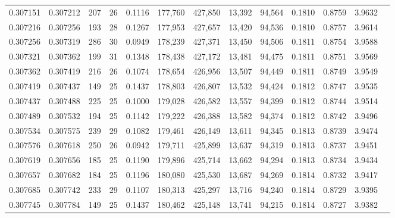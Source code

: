 \begin{tabular}{rrrrrrrrrrrrr}
0.307151 & 0.307212 &   207 &  26 &                                     0.1116 & 177,760 & 427,850 &  13,392 &  94,564 & 0.1810 & 0.8759 & 3.9632 \\
0.307216 & 0.307256 &   193 &  28 &                                     0.1267 & 177,953 & 427,657 &  13,420 &  94,536 & 0.1810 & 0.8757 & 3.9614 \\
0.307256 & 0.307319 &   286 &  30 &                                     0.0949 & 178,239 & 427,371 &  13,450 &  94,506 & 0.1811 & 0.8754 & 3.9588 \\
0.307321 & 0.307362 &   199 &  31 &                                     0.1348 & 178,438 & 427,172 &  13,481 &  94,475 & 0.1811 & 0.8751 & 3.9569 \\
0.307362 & 0.307419 &   216 &  26 &                                     0.1074 & 178,654 & 426,956 &  13,507 &  94,449 & 0.1811 & 0.8749 & 3.9549 \\
0.307419 & 0.307437 &   149 &  25 &                                     0.1437 & 178,803 & 426,807 &  13,532 &  94,424 & 0.1812 & 0.8747 & 3.9535 \\
0.307437 & 0.307488 &   225 &  25 &                                     0.1000 & 179,028 & 426,582 &  13,557 &  94,399 & 0.1812 & 0.8744 & 3.9514 \\
0.307489 & 0.307532 &   194 &  25 &                                     0.1142 & 179,222 & 426,388 &  13,582 &  94,374 & 0.1812 & 0.8742 & 3.9496 \\
0.307534 & 0.307575 &   239 &  29 &                                     0.1082 & 179,461 & 426,149 &  13,611 &  94,345 & 0.1813 & 0.8739 & 3.9474 \\
0.307576 & 0.307618 &   250 &  26 &                                     0.0942 & 179,711 & 425,899 &  13,637 &  94,319 & 0.1813 & 0.8737 & 3.9451 \\
0.307619 & 0.307656 &   185 &  25 &                                     0.1190 & 179,896 & 425,714 &  13,662 &  94,294 & 0.1813 & 0.8734 & 3.9434 \\
0.307657 & 0.307682 &   184 &  25 &                                     0.1196 & 180,080 & 425,530 &  13,687 &  94,269 & 0.1814 & 0.8732 & 3.9417 \\
0.307685 & 0.307742 &   233 &  29 &                                     0.1107 & 180,313 & 425,297 &  13,716 &  94,240 & 0.1814 & 0.8729 & 3.9395 \\
0.307745 & 0.307784 &   149 &  25 &                                     0.1437 & 180,462 & 425,148 &  13,741 &  94,215 & 0.1814 & 0.8727 & 3.9382 \\

\end{tabular}
